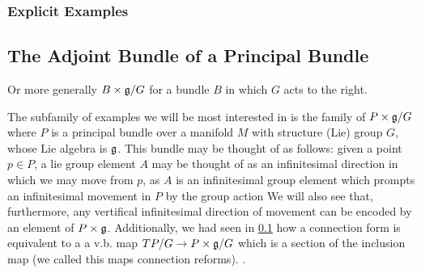 \subsubsection{Explicit Examples}



\subsection{The Adjoint Bundle of a Principal Bundle}

Or more generally $B \times \mathfrak{g} / G$ for a bundle $B$ in which $G$ acts to the right.

The subfamily of examples we will be most interested in is the family of $P \times \mathfrak{g}/G$ where $P$ is a principal bundle over a manifold $M$ with structure (Lie) group $G$, whose Lie  algebra is $\mathfrak{g}$. This bundle may be thought of as follows: given a point $p \in P$, a lie group element $A$ may be thought of as an infinitesimal direction in which we may move from $p$, as $A$ is an infinitesimal group element which prompts an infinitesimal movement in $P$ by the group action We will also see that, furthermore, any vertifical infinitesimal direction of movement can be encoded by an element of $P \times \mathfrak{g}$. Additionally, we had seen in \ref{} how a connection form is equivalent to a  a v.b. map $TP/G \to P \times \mathfrak{g}/G$ which is a section of the inclusion map (we called this maps connection reforms). .


